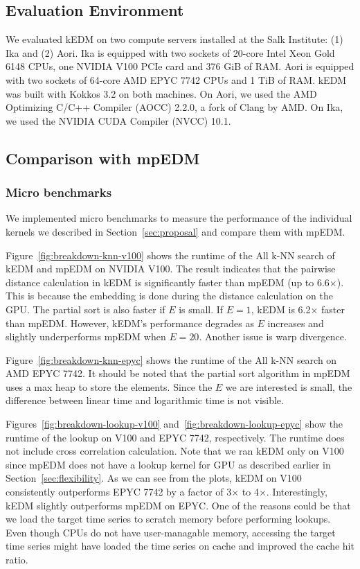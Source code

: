 \documentclass[conference]{IEEEtran}
\begin{document}
\subsection{Evaluation Environment}


We evaluated kEDM on two compute servers installed at the Salk Institute: (1)
Ika and (2) Aori. Ika is equipped with two sockets of 20-core Intel Xeon Gold
6148 CPUs, one NVIDIA V100 PCIe card and 376 GiB of RAM\@. Aori is equipped with
two sockets of 64-core AMD EPYC 7742 CPUs and 1 TiB of RAM\@. kEDM was built
with Kokkos 3.2 on both machines. On Aori, we used the AMD Optimizing C/C++
Compiler (AOCC) 2.2.0, a fork of Clang by AMD. On Ika, we used the NVIDIA CUDA
Compiler (NVCC) 10.1.

\subsection{Comparison with mpEDM}

\subsubsection{Micro benchmarks}

We implemented micro benchmarks to measure the performance of the individual
kernels we described in Section~\ref{sec:proposal} and compare them with
mpEDM\@.

Figure~\ref{fig:breakdown-knn-v100} shows the runtime of the All k-NN search
of kEDM and mpEDM on NVIDIA V100. The result indicates that the pairwise
distance calculation in kEDM is significantly faster than mpEDM (up to
6.6$\times$). This is because the embedding is done during the distance
calculation on the GPU\@. The partial sort is also faster if $E$ is small. If
$E=1$, kEDM is 6.2$\times$ faster than mpEDM\@. However, kEDM's performance
degrades as $E$ increases and slightly underperforms mpEDM when $E=20$.
Another issue is warp divergence.

Figure~\ref{fig:breakdown-knn-epyc} shows the runtime of the All k-NN search
on AMD EPYC 7742. It should be noted that the partial sort algorithm in mpEDM
uses a max heap to store the elements. Since the $E$ we are interested is
small, the difference between linear time and logarithmic time is not visible.


Figures~\ref{fig:breakdown-lookup-v100} and~\ref{fig:breakdown-lookup-epyc}
show the runtime of the lookup on V100 and EPYC 7742, respectively. The runtime
does not include cross correlation calculation. Note that we ran kEDM only on
V100 since mpEDM does not have a lookup kernel for GPU as described earlier in
Section~\ref{sec:flexibility}. As we can see from the plots, kEDM on V100
consistently outperforms EPYC 7742 by a factor of 3$\times$ to 4$\times$.
Interestingly, kEDM slightly outperforms mpEDM on EPYC. One of the reasons could
be that we load the target time series to scratch memory before performing
lookups. Even though CPUs do not have user-managable memory, accessing the
target time series might have loaded the time series on cache and improved the
cache hit ratio.
\end{document}
